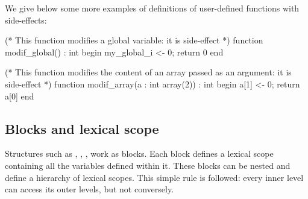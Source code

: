 \begin{example}
We give below some more examples of definitions of user-defined functions with side-effects:

\begin{IMITATORmodel}
(* This function modifies a global variable: it is side-effect *)
function modif_global() : int
begin
	my_global_i <- 0;
	return 0
end

(* This function modifies the content of an array passed as an argument: it is side-effect  *)
function modif_array(a : int array(2)) : int
begin
	a[1] <- 0;
	return a[0]
end
\end{IMITATORmodel}
\end{example}


%
%
%



\subsection{Blocks and lexical scope}\label{section:variable_scope}


Structures such as , , ,  work as blocks.
Each block defines a lexical scope containing all the variables defined within it.
These blocks can be nested and define a hierarchy of lexical scopes.
This simple rule is followed: every inner level can access its outer levels, but not conversely.

